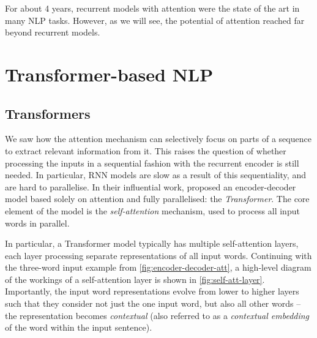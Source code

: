 \documentclass[bsc,frontabs,singlespacing,parskip,deptreport]{infthesis}
\begin{document}
{{    For about 4 years, recurrent models with attention were the state of the art in many NLP tasks. However, as we will see, the potential of attention reached far beyond recurrent models.
  }

  \section{Transformer-based NLP}{
    \label{sec:Transformer-based-NLP}
    \subsection{Transformers}{
      \label{sec:Transformers}
      We saw how the attention mechanism can selectively focus on parts of a sequence to extract relevant information from it. This raises the question of whether processing the inputs in a sequential fashion with the recurrent encoder is still needed. In particular, RNN models are slow as a result of this sequentiality, and are hard to parallelise. In their influential work, \citet{Vaswani_2017} proposed an encoder-decoder model based solely on attention and fully parallelised: the \textit{Transformer}. The core element of the model is the \textit{self-attention} mechanism, used to process all input words in parallel.

      In particular, a Transformer model typically has multiple self-attention layers, each layer processing separate representations of all input words. Continuing with the three-word input example from \autoref{fig:encoder-decoder-att}, a high-level diagram of the workings of a self-attention layer is shown in \autoref{fig:self-att-layer}. Importantly, the input word representations evolve from lower to higher layers such that they consider not just the one input word, but also all other words -- the representation becomes \textit{contextual} (also referred to as a \textit{contextual embedding} of the word within the input sentence).

}}}
\end{document}
